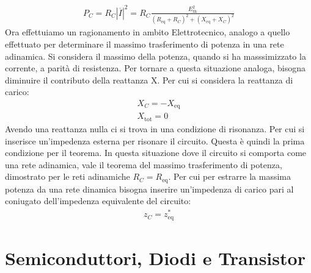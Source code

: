 \documentclass{article}
\numberwithin{equation}{subsection}
\begin{document}
\begin{gather*}
    P_C=R_C|\overline I|^2=R_C\displaystyle\frac{E_\mathrm{th}^2}{(R_\mathrm{eq}+R_C)^2+(X_\mathrm{eq}+X_C)^2}
\end{gather*}
Ora effettuiamo un ragionamento in ambito Elettrotecnico, analogo a quello effettuato per determinare il massimo trasferimento di potenza in una rete adinamica. Si considera il massimo della potenza, quando si ha masssimizzato la corrente, a parità di resistenza. Per tornare a questa situazione analoga, bisogna diminuire il contributo della reattanza X. Per cui si considera la reattanza di carico:
\begin{gather*}
    X_C=-X_\mathrm{eq}\\
    X_\mathrm{tot}=0
\end{gather*}
Avendo una reattanza nulla ci si trova in una condizione di risonanza. Per cui si inserisce un'impedenza esterna per risonare il circuito. Questa è quindi la prima 
condizione per il teorema. In questa situazione dove il circuito si comporta come una rete adinamica, vale il teorema del massimo trasferimento di potenza, dimostrato 
per le reti adinamiche $R_C=R_\mathrm{eq}$. 
Per cui per estrarre la massima potenza da una rete dinamica bisogna inserire un'impedenza di carico pari al coniugato dell'impedenza equivalente del circuito:
\begin{gather}
    z_C=z_\mathrm{eq}^*
\end{gather}
\newpage
\section{Semiconduttori, Diodi e Transistor}
\end{document}
